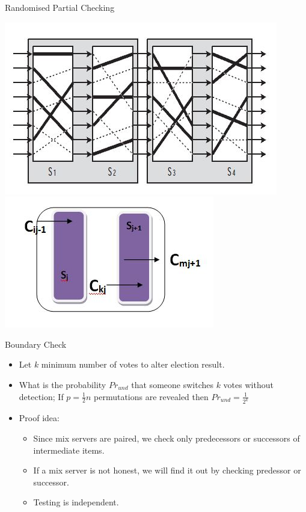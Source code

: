 \documentclass{beamer}
\begin{document}
\begin{frame}[allowframebreaks]{Randomised Partial Checking \cite{JJR02}}
\begin{center}
\includegraphics[scale=0.4]{rpc.jpg}
\includegraphics[scale=0.4]{duds.jpg} 
\end{center}

\framebreak

\begin{block}{Boundary Check}
\begin{itemize}
\item Let $k$ minimum number of votes to alter election result.
\item What is the probability $Pr_{und}$ that someone switches $k$ votes without detection; If $p=\frac{1}{2}n$ permutations are revealed then  $Pr_{und} = \frac{1}{2^k}$
\item Proof idea: 
\begin{itemize}
\item Since mix servers are paired, we check only predecessors or successors of intermediate items.
\item If a mix server is not honest, we will find it out by checking predessor or successor.
\item Testing is independent.
\end{itemize}
\end{itemize}
\end{block}

 
 

\end{frame}
\end{document}
